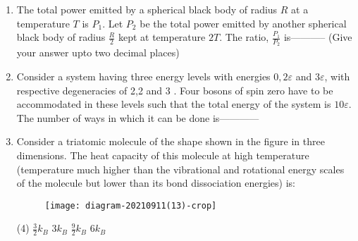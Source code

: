 \begin{enumerate}
\item The total power emitted by a spherical black body of radius $R$ at a temperature $T$ is $P_{1}$. Let $P_{2}$ be the total power emitted by another spherical black body of radius $\frac{R}{2}$ kept at temperature $2 T$. The ratio, $\frac{P_{1}}{P_{2}}$ is----------- (Give your answer upto two decimal places)
{}


\item Consider a system having three energy levels with energies $0,2 \varepsilon$ and $3 \varepsilon$, with respective degeneracies of 2,2 and 3 . Four bosons of spin zero have to be accommodated in these levels such that the total energy of the system is $10 \varepsilon$. The number of ways in which it can be done is------------
{}

\item Consider a triatomic molecule of the shape shown in the figure in three dimensions. The heat capacity of this molecule at high temperature (temperature much higher than the vibrational and rotational energy scales of the molecule but lower than its bond dissociation energies) is:
{}
\begin{figure}[H]
	\centering
	\texttt{[image: diagram-20210911(13)-crop]}
\end{figure}
\begin{tasks}(4)
	\task[\textbf{A.}] $\frac{3}{2} k_{B}$
	\task[\textbf{B.}] $3 k_{B}$
	\task[\textbf{C.}] $\frac{9}{2} k_{B}$
	\task[\textbf{D.}] $6 k_{B}$
\end{tasks}


\end{enumerate}
